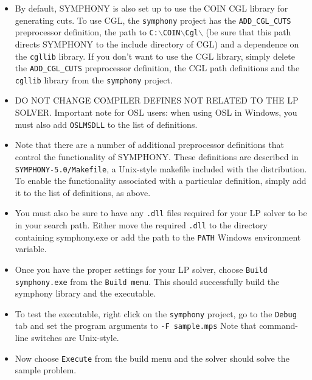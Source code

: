 \begin{itemize}
\begin{itemize}
\end{itemize}

\item By default, SYMPHONY is also set up to use the COIN CGL library for
generating cuts. To use CGL, the \texttt{symphony} project has the
\texttt{ADD\_CGL\_CUTS} preprocessor definition, the path to
\texttt{C:$\backslash$COIN$\backslash$Cgl$\backslash$} (be sure that this path
directs SYMPHONY to the include directory of CGL) and a dependence on the
\texttt{cgllib} library. If you don't want to use the CGL library, simply
delete the \texttt{ADD\_CGL\_CUTS} preprocessor definition, the CGL path
definitions and the \texttt{cgllib} library from the \texttt{symphony}
project.

\item DO NOT CHANGE COMPILER DEFINES NOT RELATED TO THE LP SOLVER. Important 
note for OSL users: when using OSL in Windows, you must also add 
\texttt{OSLMSDLL} to the list of definitions.

\item Note that there are a number of additional preprocessor definitions that
control the functionality of SYMPHONY. These definitions are described in
\texttt{SYMPHONY-5.0/Makefile}, a Unix-style makefile included with the
distribution. To enable the functionality associated with a particular
definition, simply add it to the list of definitions, as above.

\item You must also be sure to have any \texttt{.dll} files required for your
LP solver to be in your search path. Either move the required \texttt{.dll} to
the directory containing symphony.exe or add the path to the \texttt{PATH}
Windows environment variable.

\item Once you have the proper settings for your LP solver, choose 
\texttt{Build symphony.exe} from the \texttt{Build menu}. This should 
successfully build the symphony library and the executable.

\item To test the executable, right click on the \texttt{symphony} project, go
to the \texttt{Debug} tab and set the program arguments to \texttt{-F
sample.mps} Note that command-line switches are Unix-style.

\item Now choose \texttt{Execute} from the build menu and the solver
should solve the sample problem.

\end{itemize}

